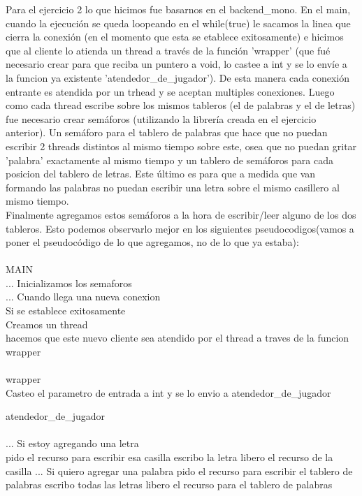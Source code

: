 Para el ejercicio 2 lo que hicimos fue basarnos en el backend_mono. En el main, cuando la ejecución se queda loopeando en el while(true) le sacamos la linea que cierra la conexión (en el momento que esta se etablece exitosamente) e hicimos que al cliente lo atienda un thread a través de la función 'wrapper' (que fué necesario crear para que reciba un puntero a void, lo castee a int y se lo envíe a la funcion ya existente 'atendedor_de_jugador'). De esta manera cada conexión entrante es atendida por un trhead y se aceptan multiples conexiones. Luego como cada thread escribe sobre los mismos tableros (el de palabras y el de letras) fue necesario crear semáforos (utilizando la librería creada en el ejercicio anterior). Un semáforo para el tablero de palabras que hace que no puedan escribir 2 threads distintos al mismo tiempo sobre este, osea que no puedan gritar 'palabra' exactamente al mismo tiempo y un tablero de semáforos para cada posicion del tablero de letras. Este último es para que a medida que van formando las palabras no puedan escribir una letra sobre el mismo casillero al mismo tiempo. \\
Finalmente agregamos estos semáforos a la hora de escribir/leer alguno de los dos tableros. Esto podemos observarlo mejor en los siguientes pseudocodigos(vamos a poner el pseudocódigo de lo que agregamos, no de lo que ya estaba):\\
\\


MAIN \\
...
Inicializamos los semaforos\\
...
Cuando llega una nueva conexion \\
Si se establece exitosamente\\
	Creamos un thread\\
	hacemos que este nuevo cliente sea atendido por el thread a traves de la funcion wrapper\\


\\

wrapper\\
Casteo el parametro de entrada a int y se lo envio a atendedor_de_jugador


atendedor_de_jugador\\ \\
...
Si estoy agregando una letra\\
	pido el recurso para escribir esa casilla
	escribo la letra
	libero el recurso de la casilla
...
Si quiero agregar una palabra
	pido el recurso para escribir el tablero de palabras
	escribo todas las letras
	libero el recurso para el tablero de palabras


